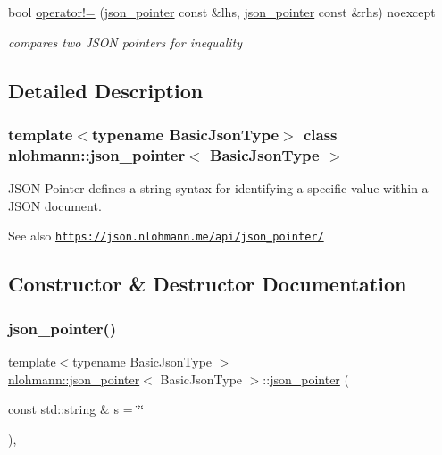 \begin{DoxyCompactItemize}
bool \hyperlink{classnlohmann_1_1json__pointer_a6779edcf28e6f018a3bbb29c0b4b5e1e}{operator!=} (\hyperlink{classnlohmann_1_1json__pointer}{json\+\_\+pointer} const \&lhs, \hyperlink{classnlohmann_1_1json__pointer}{json\+\_\+pointer} const \&rhs) noexcept
\begin{DoxyCompactList}\small\item\em compares two J\+S\+ON pointers for inequality \end{DoxyCompactList}\end{DoxyCompactItemize}


\subsection{Detailed Description}
\subsubsection*{template$<$typename Basic\+Json\+Type$>$\newline
class nlohmann\+::json\+\_\+pointer$<$ Basic\+Json\+Type $>$}

J\+S\+ON Pointer defines a string syntax for identifying a specific value within a J\+S\+ON document. 

\begin{DoxySeeAlso}{See also}
\href{https://json.nlohmann.me/api/json_pointer/}{\tt https\+://json.\+nlohmann.\+me/api/json\+\_\+pointer/} 
\end{DoxySeeAlso}


\subsection{Constructor \& Destructor Documentation}
\mbox{\label{classnlohmann_1_1json__pointer_a7f32d7c62841f0c4a6784cf741a6e4f8}} 
\subsubsection{\texorpdfstring{json\+\_\+pointer()}{json\_pointer()}}
{\footnotesize\ttfamily template$<$typename Basic\+Json\+Type $>$ \\
\hyperlink{classnlohmann_1_1json__pointer}{nlohmann\+::json\+\_\+pointer}$<$ Basic\+Json\+Type $>$\+::\hyperlink{classnlohmann_1_1json__pointer}{json\+\_\+pointer} (\begin{DoxyParamCaption}\item[{const std\+::string \&}]{s = {\ttfamily \char`\"{}\char`\"{}} }\end{DoxyParamCaption})\hspace{0.3cm}{\ttfamily [inline]}, {\ttfamily [explicit]}}



